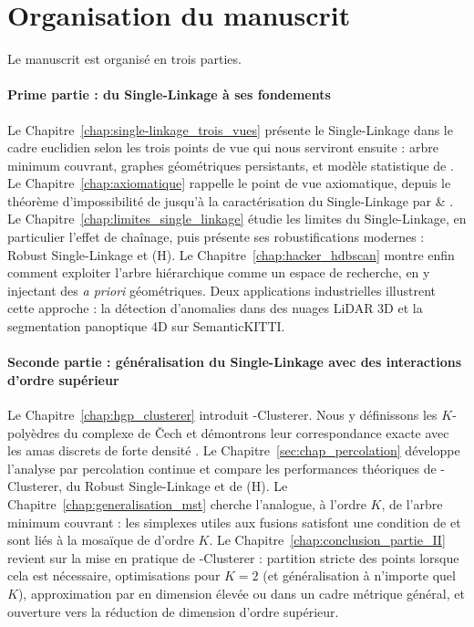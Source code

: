 \section{Organisation du manuscrit}

Le manuscrit est organisé en trois parties.

\paragraph{Prime partie : du Single-Linkage à ses fondements}
Le Chapitre~\ref{chap:single-linkage_trois_vues} présente le Single-Linkage dans le cadre euclidien selon les trois points de vue qui nous serviront ensuite : arbre minimum couvrant, graphes géométriques persistants, et modèle statistique de . 
Le Chapitre~\ref{chap:axiomatique} rappelle le point de vue axiomatique, depuis le théorème d'impossibilité de
 jusqu'à la caractérisation du Single-Linkage par  \& .
Le Chapitre~\ref{chap:limites_single_linkage} étudie les limites du Single-Linkage, en particulier l'effet de chaînage, puis présente ses robustifications modernes : Robust Single-Linkage et (H)\DBSCAN. 
Le Chapitre~\ref{chap:hacker_hdbscan} montre enfin comment exploiter l'arbre hiérarchique comme un espace de recherche, en y injectant des \emph{a priori} géométriques. 
Deux applications industrielles illustrent cette approche : la détection d'anomalies dans des nuages LiDAR 3D et la segmentation panoptique 4D sur SemanticKITTI.

\paragraph{Seconde partie : généralisation du Single-Linkage avec des interactions d'ordre supérieur}
Le Chapitre~\ref{chap:hgp_clusterer} introduit \HGP-Clusterer. Nous y définissons les $K$-polyèdres du complexe de \v{C}ech et démontrons leur correspondance exacte avec les amas discrets de forte densité \KNN. 
Le Chapitre~\ref{sec:chap_percolation} développe l'analyse par percolation continue et compare les performances théoriques de \HGP-Clusterer, du Robust Single-Linkage et de (H)\DBSCAN. 
Le Chapitre~\ref{chap:generalisation_mst} cherche l'analogue, à l'ordre $K$, de l'arbre minimum couvrant : les simplexes utiles aux fusions satisfont une condition de  et sont liés à la mosaïque de  d'ordre $K$. 
Le Chapitre~\ref{chap:conclusion_partie_II} revient sur la mise en pratique de \HGP-Clusterer : partition stricte des points lorsque cela est nécessaire, optimisations pour $K=2$ (et généralisation à n'importe quel $K$), approximation par  en dimension élevée ou dans un cadre métrique général, et ouverture vers la réduction de dimension d'ordre supérieur.

